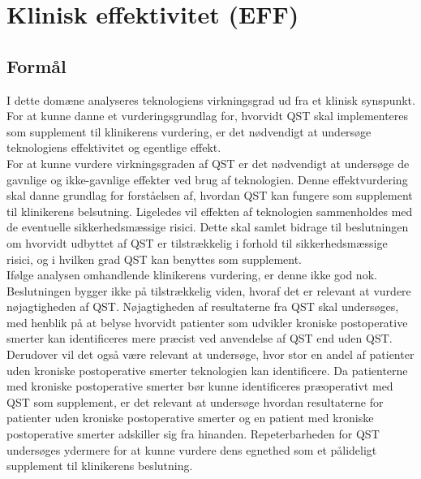 \section{Klinisk effektivitet (EFF)}
\subsection{Formål}
I dette domæne analyseres teknologiens virkningsgrad ud fra et klinisk synspunkt. For at kunne danne et vurderingsgrundlag for, hvorvidt QST skal implementeres som supplement til klinikerens vurdering, er det nødvendigt at undersøge teknologiens effektivitet og egentlige effekt.\\
For at kunne vurdere virkningsgraden af QST er det nødvendigt at undersøge de gavnlige og ikke-gavnlige effekter ved brug af teknologien. Denne effektvurdering skal danne grundlag for forståelsen af,  hvordan QST kan fungere som supplement til klinikerens belsutning. Ligeledes vil effekten af teknologien sammenholdes med de eventuelle sikkerhedsmæssige risici. Dette skal samlet bidrage til beslutningen om hvorvidt udbyttet af QST er tilstrækkelig i forhold til sikkerhedsmæssige risici, og i hvilken grad QST kan benyttes som supplement. \\
Ifølge analysen omhandlende klinikerens vurdering, er denne ikke god nok. Beslutningen bygger ikke på tilstrækkelig viden, hvoraf det er relevant at vurdere nøjagtigheden af QST. Nøjagtigheden af resultaterne fra QST skal undersøges, med henblik på at belyse hvorvidt patienter som udvikler kroniske postoperative smerter kan identificeres mere præcist ved anvendelse af QST end uden QST. Derudover vil det også være relevant at undersøge, hvor stor en andel af patienter uden kroniske postoperative  smerter teknologien kan identificere. Da patienterne med kroniske postoperative smerter bør kunne identificeres præoperativt med QST som supplement, er det relevant at undersøge hvordan resultaterne for patienter uden kroniske postoperative smerter og en patient med kroniske postoperative smerter adskiller sig fra hinanden. Repeterbarheden for QST undersøges ydermere for at kunne vurdere dens egnethed som et pålideligt supplement til klinikerens beslutning.

